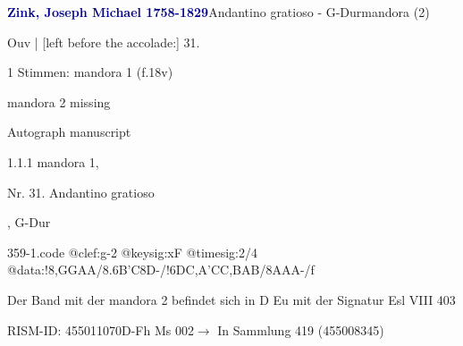 \documentclass[twocolumn]{book}
\begin{document}
\par \vspace{7pt} \textcolor{darkblue}{\textbf{Zink, Joseph Michael  1758-1829}}\hfillplus{\textbf{[359]}}\newline Andantino gratioso - G-Dur\newline mandora (2)
\par \begin{itshape}[f.18v, at left:] Ouv | [left before the accolade:] 31.\end{itshape} 
\par \textcolor{darkblue}{}  1 Stimmen: mandora 1  (f.18v)\newline \begin{small} mandora 2 missing\end{small} \newline Autograph manuscript
\par 1.1.1  mandora 1, \begin{itshape}Nr. 31. Andantino gratioso\end{itshape}, G-Dur  
\begin{filecontents*}{359-1.code}
@clef:g-2
@keysig:xF
@timesig:2/4
@data:!8,GGAA/{8.6B'C}8D-/!{6DC}{,A'C}{C,B}{AB}/8AAA-/f
\end{filecontents*}
\newline
%
\par Der Band mit der mandora 2 befindet sich in D Eu mit der Signatur Esl VIII 403
\par RISM-ID: 455011070\newline D-Fh  Ms 002\newline $\rightarrow$ In Sammlung 419 (455008345)
      
\end{document}
